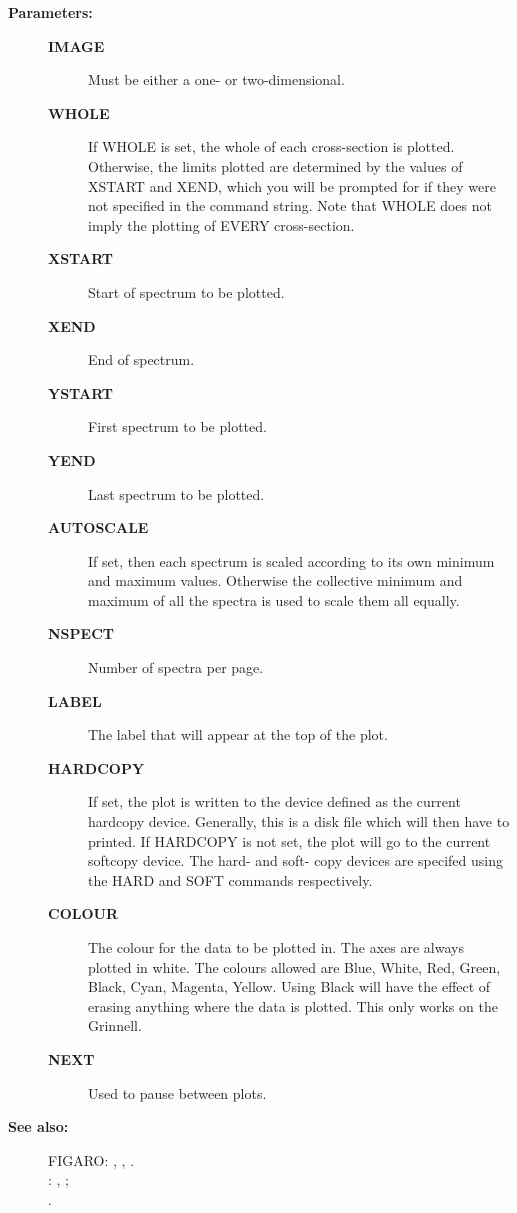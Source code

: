 \begin{description}
\begin{description}
\item [\textbf{Parameters:}]
\begin{description}
\item [\textbf{IMAGE}]
 Must be either a one- or two-dimensional.
\item [\textbf{WHOLE}]
 If WHOLE is set, the whole of each cross-section is plotted.
 Otherwise, the limits plotted are determined by the values of XSTART
 and XEND, which you will be prompted for if they were not specified
 in the command string.  Note that WHOLE does not imply the plotting
 of EVERY cross-section.
\item [\textbf{XSTART}]
 Start of spectrum to be plotted.
\item [\textbf{XEND}]
 End of spectrum.
\item [\textbf{YSTART}]
 First spectrum to be plotted.
\item [\textbf{YEND}]
 Last spectrum to be plotted.
\item [\textbf{AUTOSCALE}]
 If set, then each spectrum is scaled according to its own minimum
 and maximum values. Otherwise the collective minimum and maximum of
 all the spectra is used to scale them all equally.
\item [\textbf{NSPECT}]
 Number of spectra per page.
\item [\textbf{LABEL}]
 The label that will appear at the top of the plot.
\item [\textbf{HARDCOPY}]
 If set, the plot is written to the device defined as the current
 hardcopy device.  Generally, this is a disk file which will then
 have to printed. If HARDCOPY is not set, the plot will go to the
 current softcopy device.  The hard- and soft- copy devices are
 specifed using the HARD and SOFT commands respectively.
\item [\textbf{COLOUR}]
 The colour for the data to be plotted in.
 The axes are always plotted in white.  The colours allowed are Blue,
 White, Red, Green, Black, Cyan, Magenta, Yellow.  Using Black will
 have the effect of erasing anything where the data is plotted.  This
 only works on the Grinnell.
\item [\textbf{NEXT}]
 Used to pause between plots.
\end{description}

\item [\textbf{See also:}]
FIGARO: , , .\\
: , ;\\
.\\



\end{description}
\end{description}
